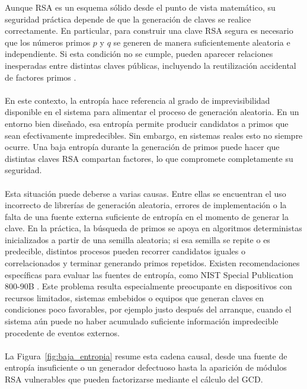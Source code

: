 Aunque RSA es un esquema sólido desde el punto de vista matemático, su seguridad práctica depende de que la generación de claves se realice correctamente. En particular, para construir una clave RSA segura es necesario que los números primos \(p\) y \(q\) se generen de manera suficientemente aleatoria e independiente. Si esta condición no se cumple, pueden aparecer relaciones inesperadas entre distintas claves públicas, incluyendo la reutilización accidental de factores primos \citep{heninger2012mining,vage2022finding,pelofske2024efficient}.
\\
\\
En este contexto, la entropía hace referencia al grado de imprevisibilidad disponible en el sistema para alimentar el proceso de generación aleatoria. En un entorno bien diseñado, esa entropía permite producir candidatos a primos que sean efectivamente impredecibles. Sin embargo, en sistemas reales esto no siempre ocurre. Una baja entropía durante la generación de primos puede hacer que distintas claves RSA compartan factores, lo que compromete completamente su seguridad.
\\
\\
Esta situación puede deberse a varias causas. Entre ellas se encuentran el uso incorrecto de librerías de generación aleatoria, errores de implementación o la falta de una fuente externa suficiente de entropía en el momento de generar la clave. En la práctica, la búsqueda de primos se apoya en algoritmos deterministas inicializados a partir de una semilla aleatoria; si esa semilla se repite o es predecible, distintos procesos pueden recorrer candidatos iguales o correlacionados y terminar generando primos repetidos. Existen recomendaciones específicas para evaluar las fuentes de entropía, como NIST Special Publication 800-90B \citep{NST800-90B}. Este problema resulta especialmente preocupante en dispositivos con recursos limitados, sistemas embebidos o equipos que generan claves en condiciones poco favorables, por ejemplo justo después del arranque, cuando el sistema aún puede no haber acumulado suficiente información impredecible procedente de eventos externos.
\\
\\
La Figura~\ref{fig:baja_entropia} resume esta cadena causal, desde una fuente de entropía insuficiente o un generador defectuoso hasta la aparición de módulos RSA vulnerables que pueden factorizarse mediante el cálculo del GCD.


